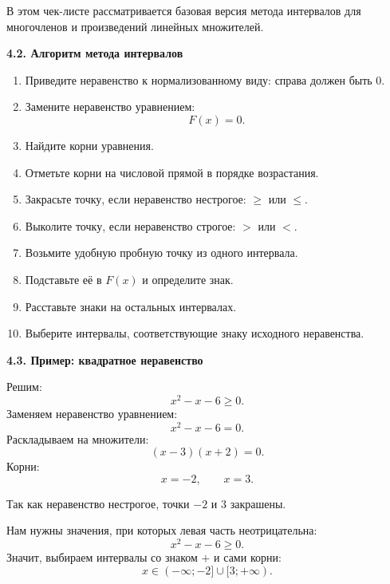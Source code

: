 \documentclass[a4paper,12pt]{article}
\newcommand{\subsectiontitle}[1]{%
  \vspace{0.5em}
  {\large\bfseries\textcolor{darkaccent}{#1}}\par
  \vspace{0.15em}
}
\newcommand{\closedpoint}[2]{\filldraw[accent] (#1,0) circle (2.2pt) node[below=6pt, text=black] {$#2$};}
\begin{document}
В этом чек-листе рассматривается базовая версия метода интервалов для многочленов и произведений линейных множителей.

\subsectiontitle{4.2. Алгоритм метода интервалов}

\begin{enumerate}
  \item Приведите неравенство к нормализованному виду: справа должен быть $0$.
  \item Замените неравенство уравнением:
  \[
  F(x)=0.
  \]
  \item Найдите корни уравнения.
  \item Отметьте корни на числовой прямой в порядке возрастания.
  \item Закрасьте точку, если неравенство нестрогое: $\ge$ или $\le$.
  \item Выколите точку, если неравенство строгое: $>$ или $<$.
  \item Возьмите удобную пробную точку из одного интервала.
  \item Подставьте её в $F(x)$ и определите знак.
  \item Расставьте знаки на остальных интервалах.
  \item Выберите интервалы, соответствующие знаку исходного неравенства.
\end{enumerate}

\subsectiontitle{4.3. Пример: квадратное неравенство}

Решим:
\[
x^2-x-6\ge 0.
\]
Заменяем неравенство уравнением:
\[
x^2-x-6=0.
\]
Раскладываем на множители:
\[
(x-3)(x+2)=0.
\]
Корни:
\[
x=-2,\qquad x=3.
\]

Так как неравенство нестрогое, точки $-2$ и $3$ закрашены.

\begin{center}
\end{center}

Нам нужны значения, при которых левая часть неотрицательна:
\[
x^2-x-6\ge 0.
\]
Значит, выбираем интервалы со знаком $+$ и сами корни:
\[
x\in(-\infty;-2]\cup[3;+\infty).
\]
\end{document}
